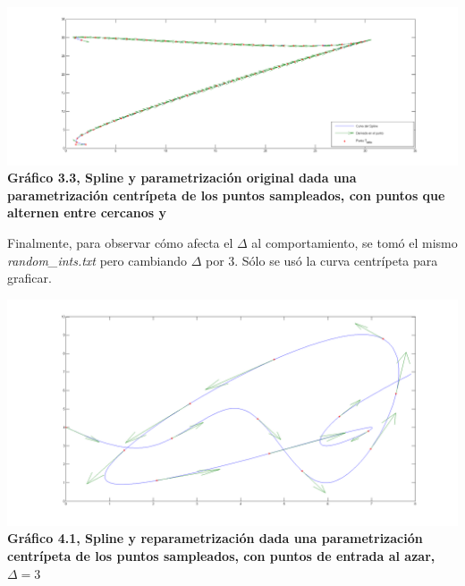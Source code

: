 \begin{center}
\includegraphics[scale=0.4]{../img/centripeta-antiu.png} \\
\scriptsize{\textsf{\textbf{Gr\'afico 3.3, Spline y parametrización original dada una parametrización centrípeta de los puntos sampleados, con puntos que alternen entre cercanos y}}}
\end{center}


Finalmente, para observar cómo afecta el $\Delta$ al comportamiento, se tomó el mismo \textit{random\_ints.txt} pero cambiando $\Delta$ por 3. Sólo se usó la curva centrípeta para graficar.

\begin{center}
\includegraphics[scale=0.4]{../img/Centripeta-delta3-rand.png} \\
\scriptsize{\textsf{\textbf{Gr\'afico 4.1, Spline y reparametrización dada una parametrización centrípeta de los puntos sampleados, con puntos de entrada al azar, $\Delta = 3$}}}
\end{center}



